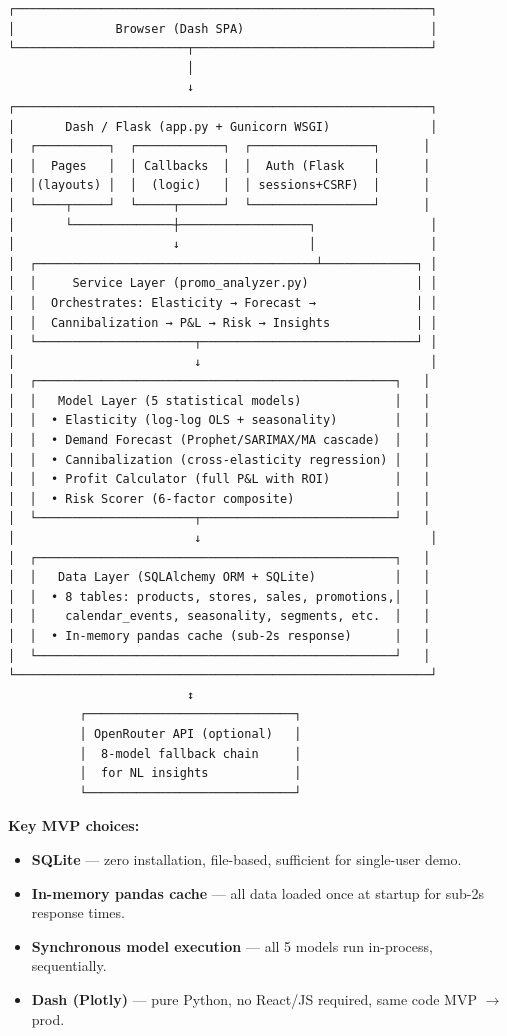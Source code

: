\documentclass[11pt, a4paper]{article}
\begin{document}
{\small
\begin{verbatim}
┌──────────────────────────────────────────────────────────┐
│              Browser (Dash SPA)                          │
└────────────────────────┬─────────────────────────────────┘
                         │
                         ↓
┌──────────────────────────────────────────────────────────┐
│       Dash / Flask (app.py + Gunicorn WSGI)              │
│  ┌──────────┐  ┌────────────┐  ┌─────────────────┐      │
│  │  Pages   │  │ Callbacks  │  │  Auth (Flask    │      │
│  │(layouts) │  │  (logic)   │  │ sessions+CSRF)  │      │
│  └────┬─────┘  └─────┬──────┘  └─────────────────┘      │
│       └──────────────┼──────────────────┐                │
│                      ↓                  │                │
│  ┌───────────────────────────────────────┴─────────────┐ │
│  │     Service Layer (promo_analyzer.py)               │ │
│  │  Orchestrates: Elasticity → Forecast →              │ │
│  │  Cannibalization → P&L → Risk → Insights            │ │
│  └──────────────────────┬──────────────────────────────┘ │
│                         ↓                                │
│  ┌──────────────────────────────────────────────────┐   │
│  │   Model Layer (5 statistical models)             │   │
│  │  • Elasticity (log-log OLS + seasonality)        │   │
│  │  • Demand Forecast (Prophet/SARIMAX/MA cascade)  │   │
│  │  • Cannibalization (cross-elasticity regression) │   │
│  │  • Profit Calculator (full P&L with ROI)         │   │
│  │  • Risk Scorer (6-factor composite)              │   │
│  └──────────────────────┬───────────────────────────┘   │
│                         ↓                                │
│  ┌──────────────────────────────────────────────────┐   │
│  │   Data Layer (SQLAlchemy ORM + SQLite)           │   │
│  │  • 8 tables: products, stores, sales, promotions,│   │
│  │    calendar_events, seasonality, segments, etc.  │   │
│  │  • In-memory pandas cache (sub-2s response)      │   │
│  └──────────────────────────────────────────────────┘   │
└──────────────────────────────────────────────────────────┘
                         ↕
          ┌─────────────────────────────┐
          │ OpenRouter API (optional)   │
          │  8-model fallback chain     │
          │  for NL insights            │
          └─────────────────────────────┘
\end{verbatim}
}

\textbf{Key MVP choices:}
\begin{itemize}[leftmargin=1.5em]
    \item \textbf{SQLite} --- zero installation, file-based, sufficient for single-user demo.
    \item \textbf{In-memory pandas cache} --- all data loaded once at startup for sub-2s response times.
    \item \textbf{Synchronous model execution} --- all 5 models run in-process, sequentially.
    \item \textbf{Dash (Plotly)} --- pure Python, no React/JS required, same code MVP $\rightarrow$ prod.
\end{itemize}
\end{document}
